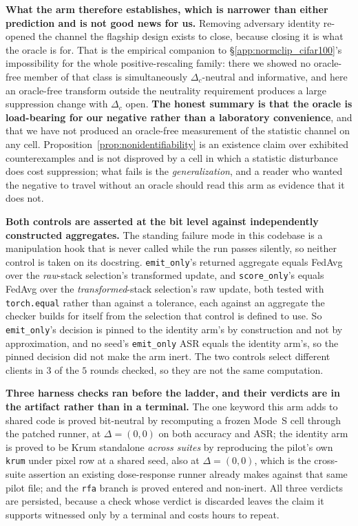 \documentclass{article}
\begin{document}
\textbf{What the arm therefore establishes, which is narrower than either prediction and is not good news for us.} Removing adversary identity re-opened the channel the flagship design exists to close, because closing it is what the oracle is for. That is the empirical companion to §\ref{app:normclip_cifar100}'s impossibility for the whole positive-rescaling family: there we showed no oracle-free member of that class is simultaneously $\Delta_c$-neutral and informative, and here an oracle-free transform outside the neutrality requirement produces a large suppression change with $\Delta_c$ open. \textbf{The honest summary is that the oracle is load-bearing for our negative rather than a laboratory convenience}, and that we have not produced an oracle-free measurement of the statistic channel on any cell. Proposition~\ref{prop:nonidentifiability} is an existence claim over exhibited counterexamples and is not disproved by a cell in which a statistic disturbance does cost suppression; what fails is the \emph{generalization}, and a reader who wanted the negative to travel without an oracle should read this arm as evidence that it does not.

\textbf{Both controls are asserted at the bit level against independently constructed aggregates.} The standing failure mode in this codebase is a manipulation hook that is never called while the run passes silently, so neither control is taken on its docstring. \texttt{emit\_only}'s returned aggregate equals FedAvg over the \emph{raw}-stack selection's transformed update, and \texttt{score\_only}'s equals FedAvg over the \emph{transformed}-stack selection's raw update, both tested with \texttt{torch.equal} rather than against a tolerance, each against an aggregate the checker builds for itself from the selection that control is defined to use. So \texttt{emit\_only}'s decision is pinned to the identity arm's by construction and not by approximation, and no seed's \texttt{emit\_only} ASR equals the identity arm's, so the pinned decision did not make the arm inert. The two controls select different clients in $3$ of the $5$ rounds checked, so they are not the same computation.

\textbf{Three harness checks ran before the ladder, and their verdicts are in the artifact rather than in a terminal.} The one keyword this arm adds to shared code is proved bit-neutral by recomputing a frozen Mode~S cell through the patched runner, at $\Delta=(0,0)$ on both accuracy and ASR; the identity arm is proved to be Krum standalone \emph{across suites} by reproducing the pilot's own \texttt{krum} under pixel row at a shared seed, also at $\Delta=(0,0)$, which is the cross-suite assertion an existing dose-response runner already makes against that same pilot file; and the \texttt{rfa} branch is proved entered and non-inert. All three verdicts are persisted, because a check whose verdict is discarded leaves the claim it supports witnessed only by a terminal and costs hours to repeat.
\end{document}
